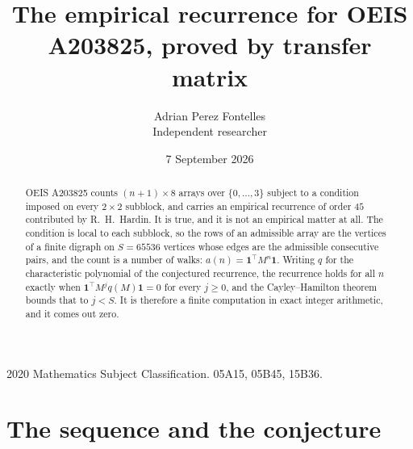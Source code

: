 \documentclass[11pt,a4paper]{article}
\title{The empirical recurrence for OEIS A203825, proved by transfer matrix}
\author{Adrian Perez Fontelles\\ \small Independent researcher}
\date{7 September 2026}
\theoremstyle{plain}
\theoremstyle{definition}
\begin{document}
\maketitle

\begin{abstract}
OEIS A203825 counts $(n+1)\times8$ arrays over $\{0,\dots,3\}$ subject to a condition imposed on
every $2\times2$ subblock, and carries an empirical recurrence of order $45$ contributed
by R.~H.~Hardin. It is true, and it is not an empirical matter at all. The condition is local
to each subblock, so the rows of an admissible array are the vertices of a finite digraph
on $S=65536$ vertices whose edges are the admissible consecutive pairs, and the count is a
number of walks: $a(n)=\mathbf{1}^{\!\top}M^{n}\mathbf{1}$. Writing $q$
for the characteristic polynomial of the conjectured recurrence, the recurrence holds for all
$n$ exactly when $\mathbf{1}^{\!\top}M^{j}q(M)\mathbf{1}=0$ for every $j\ge0$, and the
Cayley--Hamilton theorem bounds that to $j<S$. It is therefore a finite computation in exact
integer arithmetic, and it comes out zero.
\end{abstract}

\noindent\small 2020 Mathematics Subject Classification. 05A15, 05B45, 15B36.\normalsize

\section{The sequence and the conjecture}
\end{document}
